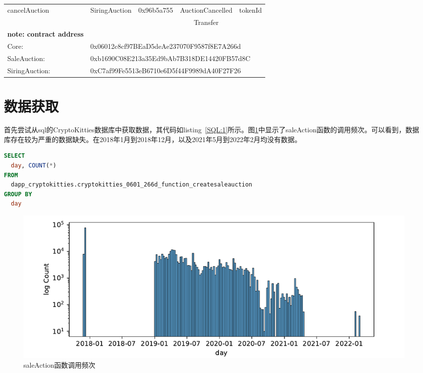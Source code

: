 \documentclass{myreport}
\begin{document}
\begin{table}[!htbp]
\begin{tabular}{lcccc}
		\midrule
		\multirow{2}{*}{cancelAuction}&\multirow{2}{*}{SiringAuction}&\multirow{2}{*}{0x96b5a755}&AuctionCancelled&\multirow{2}{*}{tokenId}\\
		&&&Transfer&\\



		\midrule
		\textbf{note: contract address}&&&&\\
		Core:&\multicolumn{4}{l}{0x06012c8cf97BEaD5deAe237070F9587f8E7A266d}\\
		SaleAuction:&\multicolumn{4}{l}{0xb1690C08E213a35Ed9bAb7B318DE14420FB57d8C}\\
		SiringAuction:&\multicolumn{4}{l}{0xC7af99Fe5513eB6710e6D5f44F9989dA40F27F26}\\
		\bottomrule
	\end{tabular}
	\label{tbl:function}
\end{table}


\section{数据获取}

首先尝试从sql的CryptoKitties数据库中获取数据，其代码如listing~\ref{SQL:1}所示。图\ref{fig:saleauction count 1}中显示了saleAction函数的调用频次。可以看到，数据库存在较为严重的数据缺失。在2018年1月到2018年12月，以及2021年5月到2022年2月均没有数据。

\begin{lstlisting}[language=Sql,escapechar=\%,caption=统计saleAuctin调用频次,label=SQL:1]
SELECT 
  day, COUNT(*) 
FROM  
  dapp_cryptokitties.cryptokitties_0601_266d_function_createsaleauction 
GROUP BY 
  day
 \end{lstlisting}

\begin{figure}[!h]
	\centering
	\includegraphics[width=\linewidth]{figure/saleauction count 1.pdf}
	\caption{saleAction函数调用频次}
	\label{fig:saleauction count 1}
\end{figure}
\end{document}
